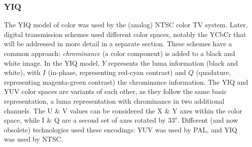 \documentclass[letterpaper]{article}
\begin{document}
{\subsubsection{YIQ}
The YIQ model of color was used by the (analog) NTSC color TV system. Later, digital transmission schemes used different color spaces, notably the YCbCr that will be addressed in more detail in a separate section. These schemes have a common approach: \textit{chrominance} (a color component) is added to a black and white image. In the YIQ model, $Y$ represents the luma information (black and white), with $I$ (in-phase, representing red-cyan contrast) and $Q$ (quadature, representing magenta-green contrast) the chrominance information.  The YIQ and YUV color spaces are variants of each other, as they follow the same basic representation, a luma representation with chrominance in two additional channels.  The U \& V values can be considered the X \& Y axes within the color space, while I \& Q are a second set of axes rotated by $33^o$. Different (and now obsolete) technologies used these encodings: YUV was used by PAL, and YIQ was used by NTSC.


}
\end{document}
